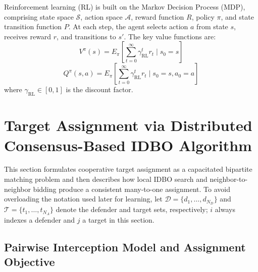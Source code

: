 \documentclass[lettersize,journal]{IEEEtran}
\begin{document}
Reinforcement learning (RL) is built on the Markov Decision Process (MDP), comprising state
space $\mathcal{S}$, action space $\mathcal{A}$, reward function $R$, policy $\pi$, and state
transition function $P$.
At each step, the agent selects action $a$ from state $s$, receives reward $r$, and
transitions to $s'$.
The key value functions are:
\begin{equation}
\label{RLV}
V^{\pi}(s)=E_{\pi}\left[\sum_{t=0}^{\infty}\gamma_{\mathrm{RL}}^{t}r_{t}\mid s_{0}=s\right]
\end{equation}
\begin{equation}
\label{RLQ}
Q^{\pi}(s,a)=E_{\pi}\left[\sum_{t=0}^{\infty}\gamma_{\mathrm{RL}}^{t}r_{t}\mid s_{0}=s,a_{0}=a\right]
\end{equation}
where $\gamma_{\mathrm{RL}}\in[0,1]$ is the discount factor.






\section{Target Assignment via Distributed Consensus-Based IDBO Algorithm}
\label{sec:target_assignment}

This section formulates cooperative target assignment as a capacitated bipartite matching
problem and then describes how local IDBO search and neighbor-to-neighbor bidding produce a
consistent many-to-one assignment. To avoid overloading the notation used later for learning,
let $\mathcal{D}=\{d_1,\ldots,d_{N_D}\}$ and
$\mathcal{T}=\{t_1,\ldots,t_{N_A}\}$ denote the defender and target sets, respectively;
$i$ always indexes a defender and $j$ a target in this section.

\subsection{Pairwise Interception Model and Assignment Objective}
\label{subsec:problem_formulation}
\end{document}
